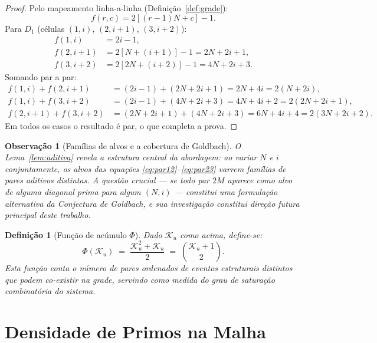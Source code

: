 \documentclass{article}
\newtheorem{remark}[proposition]{Observação}
\newtheorem{definition}[proposition]{Definição}
\begin{document}
	\begin{proof}
		Pelo mapeamento linha-a-linha (Defini\c{c}\~ao~\ref{def:grade}):
		\[
		f(r,c) = 2[(r-1)N + c] - 1.
		\]
		Para $D_1$ (c\'elulas $(1,i)$, $(2,i+1)$, $(3,i+2)$):
		\begin{align*}
			f(1,i) &= 2i - 1, \\
			f(2,i+1) &= 2[N + (i+1)] - 1 = 2N + 2i + 1, \\
			f(3,i+2) &= 2[2N + (i+2)] - 1 = 4N + 2i + 3.
		\end{align*}
		Somando par a par:
		\begin{align*}
			f(1,i) + f(2,i+1) &= (2i-1) + (2N+2i+1) = 2N + 4i = 2(N+2i),\\
			f(1,i) + f(3,i+2) &= (2i-1) + (4N+2i+3) = 4N + 4i + 2 = 2(2N+2i+1),\\
			f(2,i+1) + f(3,i+2) &= (2N+2i+1) + (4N+2i+3) = 6N+4i+4 = 2(3N+2i+2).
		\end{align*}
		Em todos os casos o resultado \'e par, o que completa a prova.
	\end{proof}
	
	\begin{remark}[Fam\'ilias de alvos e a cobertura de Goldbach]
		\label{rem:familias}
		O Lema~\ref{lem:aditiva} revela a estrutura central da abordagem:
		ao variar $N$ e $i$ conjuntamente, os alvos das equa\c{c}\~oes
		\eqref{eq:par12}--\eqref{eq:par23} varrem fam\'ilias de pares
		aditivos distintas. A quest\~ao crucial --- se todo par $2M$
		aparece como alvo de alguma diagonal prima para algum $(N, i)$
		--- constitui uma formula\c{c}\~ao alternativa da Conjectura de
		Goldbach, e sua investiga\c{c}\~ao constitui dire\c{c}\~ao futura
		principal deste trabalho.
	\end{remark}
	
	\begin{definition}[Função de acúmulo $\Phi$]
		\label{def:phi}
		Dado $\mathcal{K}_u$ como acima, define-se:
		\[
		\Phi(\mathcal{K}_u)
		\;=\; \frac{\mathcal{K}_u^2 + \mathcal{K}_u}{2}
		\;=\; \binom{\mathcal{K}_u + 1}{2}.
		\]
		Esta função conta o número de \emph{pares ordenados} de eventos
		estruturais distintos que podem co-existir na grade, servindo
		como medida do grau de saturação combinatória do sistema.
	\end{definition}
	
	\section{Densidade de Primos na Malha}
	\label{sec:densidade}
	
\end{document}
